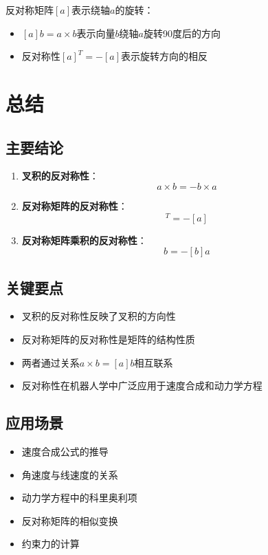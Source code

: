\documentclass[12pt,a4paper]{article}
\begin{document}
反对称矩阵$[a]$表示绕轴$a$的旋转：
\begin{itemize}
\item $[a] b = a \times b$表示向量$b$绕轴$a$旋转90度后的方向
\item 反对称性$[a]^T = -[a]$表示旋转方向的相反
\end{itemize}

\section{总结}

\subsection{主要结论}

\begin{enumerate}
\item \textbf{叉积的反对称性}：
\begin{equation}
a \times b = -b \times a
\end{equation}

\item \textbf{反对称矩阵的反对称性}：
\begin{equation}
[a]^T = -[a]
\end{equation}

\item \textbf{反对称矩阵乘积的反对称性}：
\begin{equation}
[a] b = -[b] a
\end{equation}
\end{enumerate}

\subsection{关键要点}

\begin{itemize}
\item 叉积的反对称性反映了叉积的方向性
\item 反对称矩阵的反对称性是矩阵的结构性质
\item 两者通过关系$a \times b = [a] b$相互联系
\item 反对称性在机器人学中广泛应用于速度合成和动力学方程
\end{itemize}

\subsection{应用场景}

\begin{itemize}
\item 速度合成公式的推导
\item 角速度与线速度的关系
\item 动力学方程中的科里奥利项
\item 反对称矩阵的相似变换
\item 约束力的计算
\end{itemize}
\end{document}
